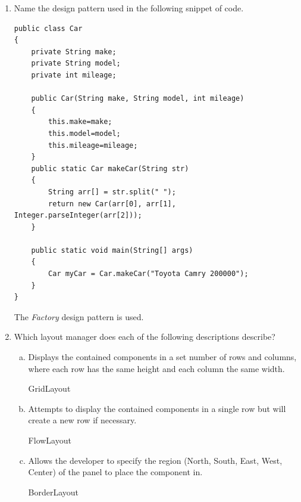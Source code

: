 \documentclass[11pt]{article}
\newenvironment{answer}{\large\lstset{basicstyle=\tiny\ttfamily}\color{white}}{}
\newenvironment{answer}{\large\lstset{basicstyle=\large\ttfamily}\color{red}}{}
\begin{document}
\begin{enumerate}
\begin{answer}
\begin{itemize}
    \end{itemize}
    \end{answer}

\item Name the design pattern used in the following snippet of code.
\begin{lstlisting}
public class Car
{
	private String make;
	private String model;
	private int mileage;

	public Car(String make, String model, int mileage)
	{
		this.make=make;
		this.model=model;
		this.mileage=mileage;
	}
	public static Car makeCar(String str)
	{
		String arr[] = str.split(" ");
		return new Car(arr[0], arr[1], Integer.parseInteger(arr[2]));
	}

	public static void main(String[] args)
	{
		Car myCar = Car.makeCar("Toyota Camry 200000");
	}
}
\end{lstlisting}

\begin{answer}
The \emph{Factory} design pattern is used.
\vspace{.5in}
\end{answer}
\pagebreak
\item Which layout manager does each of the following descriptions describe?
\begin{enumerate}[(a)]

\item Displays the contained components in a set number of rows and columns,
      where each row has the same height and each column the same width.

\begin{answer}
GridLayout
\vspace{.5in}
\end{answer}

\item Attempts to display the contained components in a single row but will
      create a new row if necessary.

\begin{answer}
FlowLayout
\vspace{.5in}
\end{answer}

\item Allows the developer to specify the region (North, South, East, West,
      Center) of the panel to place the component in.

\begin{answer}
BorderLayout
\vspace{.5in}
\end{answer}


\end{enumerate}
\end{enumerate}
\end{document}
